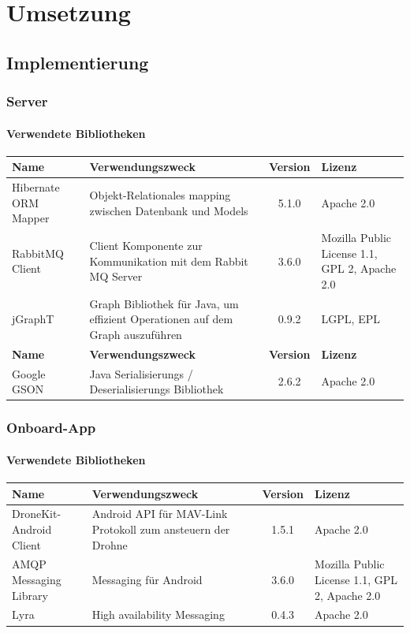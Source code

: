\newpage
\chapter{Umsetzung}

\section{Implementierung}

\subsection{Server}

\subsubsection{Verwendete Bibliotheken}
\begin{tabularx}{\textwidth}{|X|X|c|X|}
	\hline
	\textbf{Name} & \textbf{Verwendungszweck} & \textbf{Version} & \textbf{Lizenz} \\
	\hline \hline
	Hibernate ORM Mapper & Objekt-Relationales mapping zwischen Datenbank und Models  & 5.1.0 & Apache 2.0\\
	\hline 
	RabbitMQ Client & Client Komponente zur Kommunikation mit dem Rabbit MQ Server & 3.6.0 &  Mozilla Public License 1.1, GPL 2, Apache 2.0 \\
	\hline 
	jGraphT & Graph Bibliothek für Java, um effizient Operationen auf dem Graph auszuführen & 0.9.2 &  LGPL, EPL \\
	\hline 
	\hline
	\textbf{Name} & \textbf{Verwendungszweck} & \textbf{Version} & \textbf{Lizenz} \\
	\hline \hline
	Google GSON & Java Serialisierungs / Deserialisierungs Bibliothek & 2.6.2 & Apache 2.0\\
	\hline 
\end{tabularx}

\subsection{Onboard-App}

\subsubsection{Verwendete Bibliotheken}
\begin{tabularx}{\textwidth}{|X|X|c|X|}
	\hline
	\textbf{Name} & \textbf{Verwendungszweck} & \textbf{Version} & \textbf{Lizenz} \\
	\hline \hline
	DroneKit-Android Client & Android API für MAV-Link Protokoll zum ansteuern der Drohne & 1.5.1 & Apache 2.0\\
	\hline 
	AMQP Messaging Library & Messaging für Android & 3.6.0 &  Mozilla Public License 1.1, GPL 2,  Apache 2.0 \\
	\hline 
	Lyra  & High availability Messaging & 0.4.3 &  Apache 2.0 \\
	\hline 
\end{tabularx}
